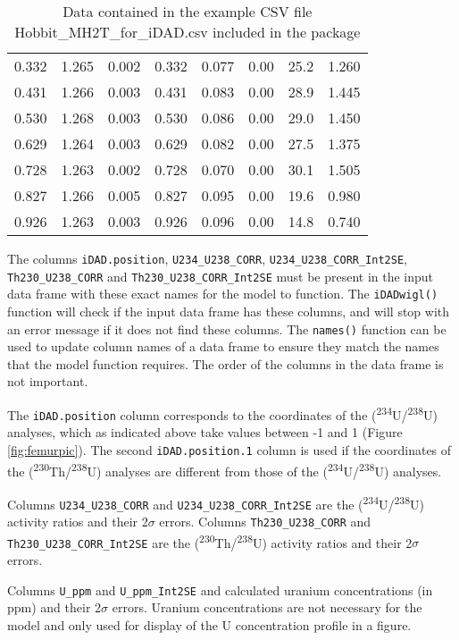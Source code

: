 \documentclass[]{elsarticle} %
\begin{document}
\begin{table}[ht]
\begin{tabular}{cccccccc}
  0.332 & 1.265 & 0.002 & 0.332 & 0.077 & 0.00 & 25.2 & 1.260 \\ 
  0.431 & 1.266 & 0.003 & 0.431 & 0.083 & 0.00 & 28.9 & 1.445 \\ 
  0.530 & 1.268 & 0.003 & 0.530 & 0.086 & 0.00 & 29.0 & 1.450 \\ 
  0.629 & 1.264 & 0.003 & 0.629 & 0.082 & 0.00 & 27.5 & 1.375 \\ 
  0.728 & 1.263 & 0.002 & 0.728 & 0.070 & 0.00 & 30.1 & 1.505 \\ 
  0.827 & 1.266 & 0.005 & 0.827 & 0.095 & 0.00 & 19.6 & 0.980 \\ 
  0.926 & 1.263 & 0.003 & 0.926 & 0.096 & 0.00 & 14.8 & 0.740 \\ 
   \hline
\end{tabular}
\caption{\label{tab:hobbitone}Data contained in the example CSV file Hobbit\_MH2T\_for\_iDAD.csv included in the package} 
\end{table}

The columns \texttt{iDAD.position}, \texttt{U234\_U238\_CORR}, \texttt{U234\_U238\_CORR\_Int2SE}, \texttt{Th230\_U238\_CORR} and \texttt{Th230\_U238\_CORR\_Int2SE} must be present in the input data frame with these exact names for the model to function. The \texttt{iDADwigl()} function will check if the input data frame has these columns, and will stop with an error message if it does not find these columns. The \texttt{names()} function can be used to update column names of a data frame to ensure they match the names that the model function requires. The order of the columns in the data frame is not important.

The \texttt{iDAD.position} column corresponds to the coordinates of the (\textsuperscript{234}U/\textsuperscript{238}U) analyses, which as indicated above take values between -1 and 1 (Figure \ref{fig:femurpic}). The second \texttt{iDAD.position.1} column is used if the coordinates of the (\textsuperscript{230}Th/\textsuperscript{238}U) analyses are different from those of the (\textsuperscript{234}U/\textsuperscript{238}U) analyses.

Columns \texttt{U234\_U238\_CORR} and \texttt{U234\_U238\_CORR\_Int2SE} are the (\textsuperscript{234}U/\textsuperscript{238}U) activity ratios and their 2\(\sigma\) errors. Columns \texttt{Th230\_U238\_CORR} and
\texttt{Th230\_U238\_CORR\_Int2SE} are the (\textsuperscript{230}Th/\textsuperscript{238}U) activity ratios and their 2\(\sigma\) errors.

Columns \texttt{U\_ppm} and \texttt{U\_ppm\_Int2SE} and calculated uranium concentrations (in ppm) and their 2\(\sigma\) errors. Uranium concentrations are not necessary for the model and only used for display of the U concentration profile in a figure.
\end{document}
